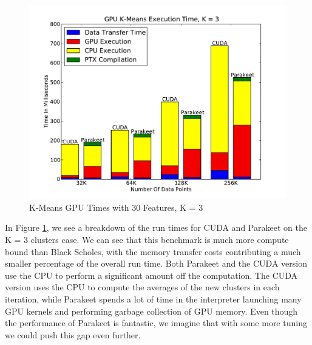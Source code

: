 \documentclass[preprint]{sigplanconf}
\begin{document}
\begin{figure}
\includegraphics[scale=0.45]{KMGPU.pdf}
\caption{K-Means GPU Times with 30 Features, K = 3}
\label{KMGPU}
\end{figure}

In Figure \ref{KMGPU}, we see a breakdown of the run times for CUDA and Parakeet on the K = 3 clusters case.  We can see that this benchmark is much more compute bound than Black Scholes, with the memory transfer costs contributing a much smaller percentage of the overall run time.  Both Parakeet and the CUDA version use the CPU to perform a significant amount off the computation.  The CUDA version uses the CPU to compute the averages of the new clusters in each iteration, while Parakeet spends a lot of time in the interpreter launching many GPU kernels and performing garbage collection of GPU memory.  Even though the performance of Parakeet is fantastic, we imagine that with some more tuning we could push this gap even further.
\end{document}
